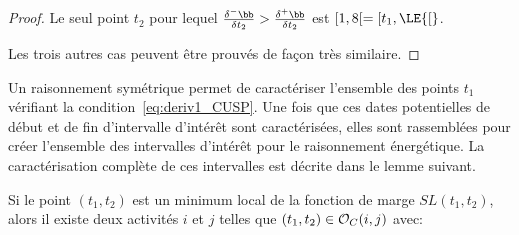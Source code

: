 \begin{proof}
Le seul point $t_2$ pour lequel $ \frac{\delta^{-}\bb}{\delta t_2} >
\frac{\delta^{+}\bb}{\delta t_2}$ est $[1,8[= [t_1, \LE{[}$. 

Les trois autres cas peuvent être prouvés de façon très similaire. 
\end{proof}

Un raisonnement symétrique permet de caractériser l'ensemble des
points $t_1$ vérifiant la condition~\eqref{eq:deriv1_CUSP}. Une fois
que ces dates potentielles de début et de fin d'intervalle d'intérêt
sont caractérisées, elles sont rassemblées pour créer l'ensemble des
intervalles d'intérêt pour le raisonnement énergétique. 
La caractérisation complète de ces intervalles est décrite dans le
lemme suivant.

\begin{lemma}
  Si le point $(t_1,t_2)$ est un minimum local de la fonction de marge
$SL(t_1,t_2)$, alors il existe deux activités $i$ et $j$ telles que
$(t_1,t_2) \in {\cal O}_C(i,j)$ avec:
  

\end{lemma}
